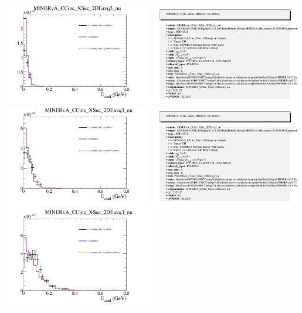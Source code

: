 \documentclass{article}
\begin{document}
\centering
\includegraphics[width=0.49\textwidth]{figures/cc_visEq3_xsec_CV_WithErr_slice_0_comp.png}
\includegraphics[width=0.49\textwidth]{figures/cc_visEq3_xsec_CV_WithErr_info.png}
\centering
\includegraphics[width=0.49\textwidth]{figures/cc_visEq3_xsec_CV_WithErr_slice_1_comp.png}
\includegraphics[width=0.49\textwidth]{figures/cc_visEq3_xsec_CV_WithErr_info.png}
\centering
\includegraphics[width=0.49\textwidth]{figures/cc_visEq3_xsec_CV_WithErr_slice_2_comp.png}
\end{document}
